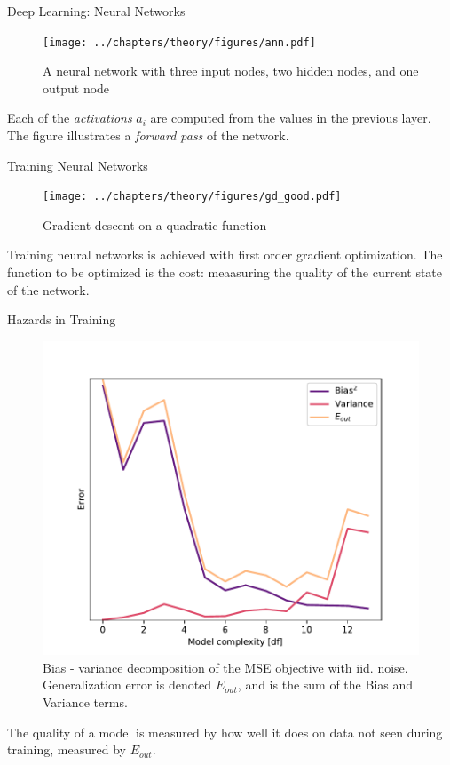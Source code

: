 \documentclass{beamer}
\begin{document}
\begin{frame}[t]{Deep Learning: Neural Networks}
	\begin{figure}[h]
		\centering
		\texttt{[image: ../chapters/theory/figures/ann.pdf]}
		\caption{A neural network with three input nodes, two hidden nodes, and one output node}
		\label{fig:ann}
	\end{figure}
	Each of the \textit{activations} $a_i$ are computed from the values in the previous layer. 
	The figure illustrates a \textit{forward pass} of the network.
\end{frame}

\begin{frame}[t]{Training Neural Networks}
	\begin{figure}[h]
		\centering
		\texttt{[image: ../chapters/theory/figures/gd\_good.pdf]}
		\caption{Gradient descent on a quadratic function}
		\label{fig:gd}
	\end{figure}

	Training neural networks is achieved with first order gradient optimization.
	The function to be optimized is the cost: meaasuring the quality of the current state of the network.
\end{frame}

\begin{frame}[t]{Hazards in Training}
	\begin{figure}[h]
		\centering
		\includegraphics[width=0.55\linewidth]{../chapters/theory/figures/bias_var_degree.pdf}
		\caption{Bias - variance decomposition of the MSE objective with iid. noise. Generalization error is denoted $E_{out}$, and is the sum of the Bias and Variance terms.}
		\label{fig:bv}
	\end{figure}
	The quality of a model is measured by how well it does on data not seen during training, measured by $E_{out}$.
\end{frame}
\end{document}
